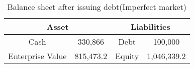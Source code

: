 \begin{table}[ht]
\centering
\begin{tabular}{@{}cccc@{}}
\toprule
\multicolumn{2}{c}{Asset}  & \multicolumn{2}{c}{Liabilities} \\ \midrule
Cash             & 330,866 & Debt           & 100,000              \\
Enterprise Value & 815,473.2 & Equity         & 1,046,339.2        \\ \bottomrule
\end{tabular}
\caption{Balance sheet after issuing debt(Imperfect market)}
\label{tab:bs_after_debt_imperfect}
\end{table}
